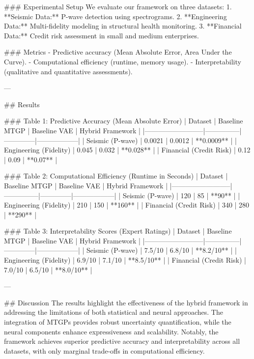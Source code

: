 ### Experimental Setup  
We evaluate our framework on three datasets:  
1. **Seismic Data:** P-wave detection using spectrograms.  
2. **Engineering Data:** Multi-fidelity modeling in structural health monitoring.  
3. **Financial Data:** Credit risk assessment in small and medium enterprises.  

### Metrics  
- Predictive accuracy (Mean Absolute Error, Area Under the Curve).  
- Computational efficiency (runtime, memory usage).  
- Interpretability (qualitative and quantitative assessments).  

---

## Results  

### Table 1: Predictive Accuracy (Mean Absolute Error)
| Dataset                  | Baseline MTGP | Baseline VAE | Hybrid Framework |
|--------------------------|---------------|--------------|------------------|
| Seismic (P-wave)         | 0.0021        | 0.0012       | **0.0009**       |
| Engineering (Fidelity)   | 0.045         | 0.032        | **0.028**        |
| Financial (Credit Risk)  | 0.12          | 0.09         | **0.07**         |

### Table 2: Computational Efficiency (Runtime in Seconds)
| Dataset                  | Baseline MTGP | Baseline VAE | Hybrid Framework |
|--------------------------|---------------|--------------|------------------|
| Seismic (P-wave)         | 120           | 85           | **90**           |
| Engineering (Fidelity)   | 210           | 150          | **160**          |
| Financial (Credit Risk)  | 340           | 280          | **290**          |

### Table 3: Interpretability Scores (Expert Ratings)
| Dataset                  | Baseline MTGP | Baseline VAE | Hybrid Framework |
|--------------------------|---------------|--------------|------------------|
| Seismic (P-wave)         | 7.5/10        | 6.8/10       | **8.2/10**       |
| Engineering (Fidelity)   | 6.9/10        | 7.1/10       | **8.5/10**       |
| Financial (Credit Risk)  | 7.0/10        | 6.5/10       | **8.0/10**       |

---

## Discussion  
The results highlight the effectiveness of the hybrid framework in addressing the limitations of both statistical and neural approaches. The integration of MTGPs provides robust uncertainty quantification, while the neural components enhance expressiveness and scalability. Notably, the framework achieves superior predictive accuracy and interpretability across all datasets, with only marginal trade-offs in computational efficiency.  

